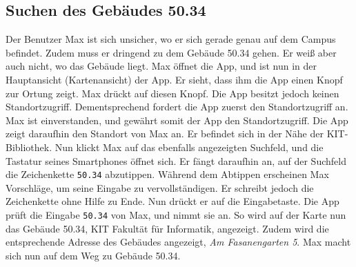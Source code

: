 \subsection{Suchen des Gebäudes 50.34}

Der \Gls{Benutzer} Max ist sich unsicher, wo er sich gerade genau auf dem \Gls{Campus} befindet.
Zudem muss er dringend zu dem Gebäude 50.34 gehen.
Er weiß aber auch nicht, wo das Gebäude liegt.
Max öffnet die App, und ist nun in der Hauptansicht (\Gls{Kartenansicht}) der App.
Er sieht, dass ihm die App einen Knopf zur \Gls{Ortung} zeigt.
Max drückt auf diesen Knopf.
Die App besitzt jedoch keinen Standortzugriff.
Dementsprechend fordert die App zuerst den Standortzugriff an.
Max ist einverstanden, und gewährt somit der App den Standortzugriff.
Die App zeigt daraufhin den Standort von Max an.
Er befindet sich in der Nähe der \Gls{KIT}-Bibliothek.
Nun klickt Max auf das ebenfalls angezeigten \Gls{Suchfeld}, und die Tastatur seines Smartphones öffnet sich.
Er fängt daraufhin an, auf der \Gls{Suchfeld} die \Gls{Zeichenkette} \texttt{50.34} abzutippen. 
Während dem Abtippen erscheinen Max Vorschläge, um seine Eingabe zu vervollständigen. 
Er schreibt jedoch die \Gls{Zeichenkette} ohne Hilfe zu Ende. 
Nun drückt er auf die Eingabetaste. 
Die App prüft die Eingabe \texttt{50.34} von Max, und nimmt sie an. 
So wird auf der Karte nun das Gebäude 50.34, \Gls{KIT} Fakultät für Informatik, angezeigt. 
Zudem wird die entsprechende Adresse des Gebäudes angezeigt, \textit{Am Fasanengarten 5}. 
Max macht sich nun auf dem Weg zu Gebäude 50.34.